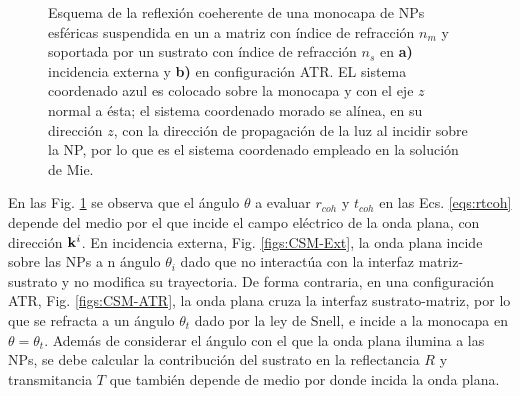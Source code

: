 \begin{figure}[h!]
\begin{subfigure}{.48\textwidth}
	\end{subfigure}
	\caption{Esquema de la reflexión coeherente de una monocapa de NPs esféricas  suspendida en un a matriz con índice de refracción $n_m$ y soportada por un sustrato con índice de refracción $n_s$ en \textbf{a)} incidencia externa  y \textbf{b)} en configuración ATR.  EL sistema coordenado azul es colocado sobre la monocapa y con el eje $z$ normal a ésta; el sistema coordenado morado se alínea,  en su dirección $z$, con la dirección de propagación de la luz al incidir sobre la NP, por lo que es el sistema coordenado empleado en la solución de Mie. }	\label{fig:CSM-Diagrams}	
	\end{figure}	

En las Fig. \ref{fig:CSM-Diagrams}	 se observa que el ángulo $\theta$ a evaluar $r_{coh}$ y $t_{coh}$ en las Ecs. \eqref{eqs:rtcoh} depende del medio por el que incide el campo eléctrico de la onda plana, con dirección $\vb{k}^i$. En incidencia externa, Fig. \ref{figs:CSM-Ext}, la onda plana incide sobre las NPs a n ángulo $\theta_i$ dado que no interactúa con la interfaz matriz-sustrato y no modifica su trayectoria. De forma contraria, en una configuración ATR, Fig. \ref{figs:CSM-ATR}, la onda plana cruza la interfaz sustrato-matriz, por lo que se refracta a un ángulo $\theta_t$ dado por la ley de Snell, e incide a la monocapa en $\theta=\theta_t$. Además de considerar el ángulo con el que la onda plana ilumina a las NPs, se debe calcular la contribución del sustrato en la reflectancia $R$ y transmitancia $T$ que también depende de medio por donde incida la onda plana.


